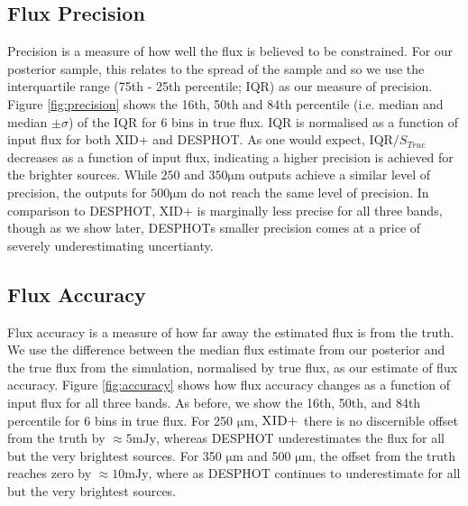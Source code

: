 \documentclass[useAMS,usenatbib]{mnras}
\begin{document}
\subsection{Flux Precision}
Precision is a measure of how well the flux is believed to be constrained. For our posterior sample, this relates to the spread of the sample and so we use the interquartile range (75th - 25th percentile; IQR) as our measure of precision. Figure \ref{fig:precision} shows the 16th, 50th and 84th percentile (i.e. median and median $\pm \sigma$) of the IQR for 6 bins in true flux. IQR is normalised as a function of input flux for both \textsc{XID+} and \textsc{DESPHOT}. As one would expect, $\mathrm{IQR}/S_{True}$ decreases as a function of input flux, indicating a higher precision is achieved for the brighter sources. While $250$ and $350\mathrm{\mu m}$ outputs achieve a similar level of precision, the outputs for $500 \mathrm{\mu m}$ do not reach the same level of precision. In comparison to \textsc{DESPHOT}, \textsc{XID+} is marginally less precise for all three bands, though as we show later, \textsc{DESPHOT}s smaller precision comes at a price of severely underestimating uncertianty. 

\subsection{Flux Accuracy}
Flux accuracy is a measure of how far away the estimated flux is from the truth. We use the difference between the median flux estimate from our posterior and the true flux from the simulation, normalised by true flux, as our estimate of flux accuracy. Figure \ref{fig:accuracy} shows how flux accuracy changes as a function of input flux for all three bands. As before, we show the 16th, 50th, and 84th percentile for 6 bins in true flux. For 250 $\mathrm{\mu m}$, $\textsc{XID+}$ there is no discernible offset from the truth by $\approx 5 \mathrm{mJy}$, whereas \textsc{DESPHOT} underestimates the flux for all but the very brightest sources. For 350 $\mathrm{\mu m}$ and 500 $\mathrm{\mu m}$, the offset from the truth reaches zero by $\approx10 \mathrm{mJy}$, where as \textsc{DESPHOT} continues to underestimate for all but the very brightest sources.
\end{document}
